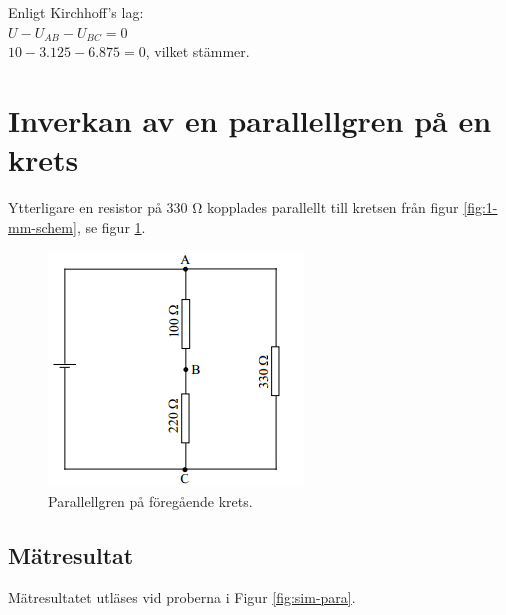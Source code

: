 \documentclass[11pt,a4paper]{article}
\begin{document}
Enligt Kirchhoff's lag:\\

$U - U_{AB} - U_{BC} = 0$\\
$10 - 3.125 - 6.875 = 0$, vilket stämmer.

\clearpage

\section{Inverkan av en parallellgren på en krets}\label{}
Ytterligare en resistor på 330 \si{\ohm} kopplades parallellt till kretsen från
figur \ref{fig:1-mm-schem}, se figur \ref{fig:2-mm-schem}.

\begin{figure}[htbp]
    \centering
        \includegraphics[scale=1.0]{misc/krets2.png}
    \caption{Parallellgren på föregående krets.}
    \label{fig:2-mm-schem}
\end{figure}

\subsection{Mätresultat}\label{}
Mätresultatet utläses vid proberna i Figur \ref{fig:sim-para}.
\end{document}
